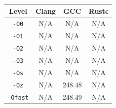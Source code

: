 \begin{tabular*}{\columnwidth}{@{\extracolsep\fill}cccc@{\extracolsep\fill}}
\toprule
\textbf{Level} & \textbf{Clang} & \textbf{GCC} & \textbf{Rustc} \\
\midrule
\texttt{-O0} & N/A & N/A & N/A \\
\texttt{-O1} & N/A & N/A & N/A \\
\texttt{-O2} & N/A & N/A & N/A \\
\texttt{-O3} & N/A & N/A & N/A \\
\texttt{-Os} & N/A & N/A & N/A \\
\texttt{-Oz} & N/A & 248.48 & N/A \\
\texttt{-Ofast} & N/A & 248.49 & N/A \\
\bottomrule
\end{tabular*}
